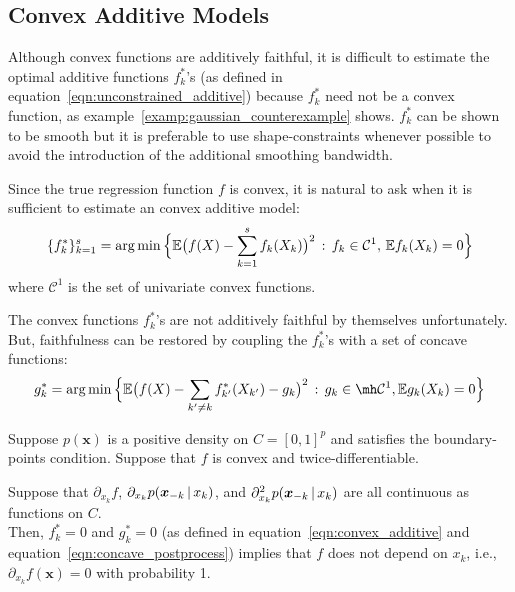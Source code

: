 \subsection{Convex Additive Models}

Although convex functions are additively faithful, it is difficult to estimate the optimal additive functions $f^*_k$'s (as defined in equation~\ref{eqn:unconstrained_additive}) because $f^*_k$ need not be a convex function, as example~\ref{examp:gaussian_counterexample} shows. $f^*_k$ can be shown to be smooth but it is preferable to use shape-constraints whenever possible to avoid the introduction of the additional smoothing bandwidth.

Since the true regression function $f$ is convex, it is natural to ask when it is sufficient to estimate an convex additive model:
\begin{equation}
\label{eqn:convex_additive}
\{ f^*_k \}_{k=1}^s = \arg\min \Big \{ 
    {\mathbb E}\big( f(X) - \sum_{k=1}^s f_k(X_k) \big)^2 \,:\, f_k \in \mathcal{C}^1, \, {\mathbb E} f_k(X_k) = 0 \Big \}
\end{equation}
where $\mathcal{C}^1$ is the set of univariate convex functions.

The convex functions $f^*_k$'s are not additively faithful by themselves unfortunately. But, faithfulness can be restored by coupling the $f^*_k$'s with a set of concave functions:
\begin{equation}
\label{eqn:concave_postprocess}
g^*_k = \arg\min \Big\{
   \E\big( f(X) - \sum_{k' \neq k} f^*_{k'}(X_{k'}) - g_k \big)^2 
    \,:\, g_k \in \mh \mathcal{C}^1, \E g_k(X_k) = 0 
  \Big\}
\end{equation}

\begin{theorem}
\label{thm:acdc_faithful}
Suppose $p(\mathbf{x})$ is a positive density on $C=[0,1]^p$ and satisfies the boundary-points condition. Suppose that $f$ is convex and twice-differentiable.

Suppose that $\partial_{x_k} f$, $\partial_{x_k} p( \mbox{\boldmath $x$}_{-k} {\,|\,} x_k )$, and $\partial_{x_k}^2 p( \mbox{\boldmath $x$}_{-k} {\,|\,} x_k)$ are all continuous as functions on $C$.\\

Then, $f^*_k = 0$ and $g^*_k = 0$ (as defined in equation~\ref{eqn:convex_additive} and equation~\ref{eqn:concave_postprocess}) implies that $f$ does not depend on $x_k$, i.e., $\partial_{x_k} f(\mathbf{x}) = 0$ with probability 1.
\end{theorem}

